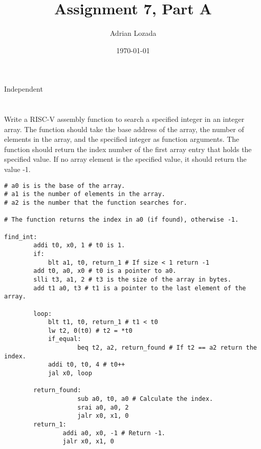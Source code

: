 \documentclass[12pt]{article}
\title{Assignment 7, Part A}
\author{Adrian Lozada}
\date{\today}
\begin{document}
\maketitle
\newpage

    \section{}
    Independent

\section{}
    \begin{flushleft}
        Write a RISC-V assembly function to search a specified integer in an integer
        array. The function should take the base address of the array, the number of elements in
        the array, and the specified integer as function arguments. The function should return the
        index number of the first array entry that holds the specified value. If no array element is the
        specified value, it should return the value -1.
    \end{flushleft}
    \begin{lstlisting}[language=RISCV]
# a0 is is the base of the array.
# a1 is the number of elements in the array.
# a2 is the number that the function searches for.

# The function returns the index in a0 (if found), otherwise -1.

find_int:
        addi t0, x0, 1 # t0 is 1.
        if: 
            blt a1, t0, return_1 # If size < 1 return -1
        add t0, a0, x0 # t0 is a pointer to a0.
        slli t3, a1, 2 # t3 is the size of the array in bytes.
        add t1 a0, t3 # t1 is a pointer to the last element of the array.
                
        loop:
            blt t1, t0, return_1 # t1 < t0
            lw t2, 0(t0) # t2 = *t0
            if_equal:
                    beq t2, a2, return_found # If t2 == a2 return the index.
            addi t0, t0, 4 # t0++
            jal x0, loop
                
        return_found:
                    sub a0, t0, a0 # Calculate the index.
                    srai a0, a0, 2
                    jalr x0, x1, 0
        return_1:
                addi a0, x0, -1 # Return -1.
                jalr x0, x1, 0
    \end{lstlisting}
    
\end{document}
